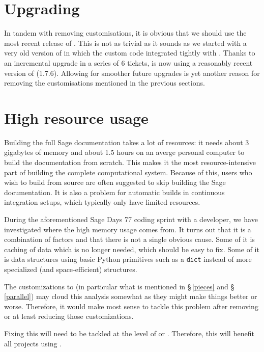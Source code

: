 \documentclass{deliverablereport}
\begin{document}
\section{Upgrading \Sphinx}

In tandem with removing customisations, it is obvious that we should
use the most recent release of \Sphinx. This is not as trivial as it
sounds as we started with a very old version of \Sphinx in which the
custom code integrated tightly with \Sphinx. Thanks to an incremental
upgrade in a series of 6 tickets, \Sage is now using a reasonably
recent version of \Sphinx (1.7.6). Allowing for smoother future
upgrades is yet another reason for removing the customisations
mentioned in the previous sections.

\section{High resource usage}\label{resources}

Building the full Sage documentation takes a lot of resources:
it needs about 3 gigabytes of memory and about 1.5 hours
on an averge personal computer to build the documentation from scratch.
This makes it the most resource-intensive part of
building the complete \Sage computational system.
Because of this, \Sage users who wish to build from source are often
suggested to skip building the Sage documentation.
It is also a problem for automatic builds in continuous integration
setups, which typically only have limited resources.

During the aforementioned Sage Days 77 coding sprint with a \Sphinx
developer, we have investigated where the high memory usage comes from.
It turns out that it is a combination of factors
and that there is not a single obvious cause.
Some of it is caching of data which is no longer needed,
which should be easy to fix.
Some of it is data structures using basic Python primitives such as a \texttt{dict}
instead of more specialized (and space-efficient) structures.

The \Sage customizations to \Sphinx
(in particular what is mentioned in \S\,\ref{pieces} and \S\,\ref{parallel})
may cloud this analysis somewhat
as they might make things better or worse.
Therefore, it would make most sense to tackle this problem after
removing or at least reducing those customizations.

Fixing this will need to be tackled at the level
of \Docutils or \Sphinx.
Therefore, this will benefit all projects using \Sphinx.
\end{document}
